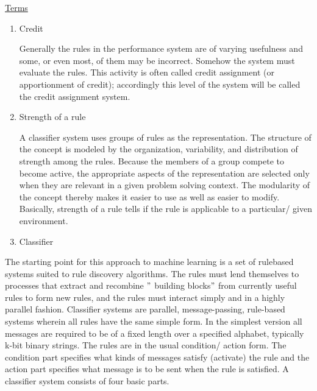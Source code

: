 \documentclass[12pt]{article}
\renewcommand{\_}{\kern-1.5pt\textunderscore\kern-1.5pt}
\begin{document}
{\fontsize{14pt}{16.8pt}\selectfont \uline{Terms}\par}\par

\begin{enumerate}
	\item Credit \par

Generally the rules in the performance system are of varying usefulness and some, or even most, of them may be incorrect. Somehow the system must evaluate the rules. This activity is often called credit assignment (or apportionment of credit); accordingly this level of the system will be called the credit assignment system. \par

	\item Strength of a rule \par

A classifier system uses groups of rules as the representation. The structure of the concept is modeled by the organization, variability, and distribution of strength among the rules. Because the members of a group compete to become active, the appropriate aspects of the representation are selected only when they are relevant in a given problem solving context. The modularity of the concept thereby makes it easier to use as well as easier to modify. Basically, strength of a rule tells if the rule is applicable to a particular/ given environment. \par

	\item Classifier 
\end{enumerate}\par

The starting point for this approach to machine learning is a set of rulebased systems suited to rule discovery algorithms. The rules must lend themselves to processes that extract and recombine $"$ building blocks$"$  from currently useful rules to form new rules, and the rules must interact simply and in a highly parallel fashion. Classifier systems are parallel, message-passing, rule-based systems wherein all rules have the same simple form. In the simplest version all messages are required to be of a fixed length over a specified alphabet, typically k-bit binary strings. The rules are in the usual condition/ action form. The condition part specifies what kinds of messages satisfy (activate) the rule and the action part specifies what message is to be sent when the rule is satisfied. A classifier system consists of four basic parts. \par
\end{document}
